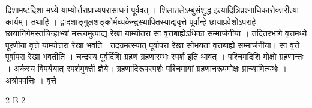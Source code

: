 \documentclass[11pt, openany]{book}
\begin{document}
\begin{sloppypar}
 दिशामष्टदिशां मध्ये याम्योर्त्तराप्राच्यपरासाधनं पूर्ववत् । शिलातलेऽम्बुसंशुद्ध इत्यादित्रिप्रश्नाधिकारोक्तरीत्या कार्यम्। तथाहि । द्वादशाङ्गुलशङ्कोर्मध्यकेन्द्रस्थापितस्याद्यवृत्ते पूर्वान्हे छायाप्रवेशोऽपराहे छायानिर्गमस्तचिन्हाभ्यां मस्त्यमुत्पाद्य रेखा याम्योतरा सा वृत्तबाह्येऽधिका सम्मार्जनीया । तदितरभागे वृत्तमध्ये पूरणीया वृत्ते याम्योत्तरा रेखा भवति। तदग्रमत्स्यात् पूर्वापरा रेखा सोभयता वृत्तबाह्ये सम्मार्जनीया। सा वृत्ते पूर्वापरा रेखा भवतीति । चन्द्रस्य पूर्वर्दिशि ग्रहणं ग्रहणारम्भः स्पर्श इति थावत् । पश्चिमदिशि मोक्षो ग्रहणान्तः । अर्कस्य विपर्ययात् स्पर्शमुक्ती ज्ञेये। ग्रहणादिरूपस्पर्शः पश्चिमायां ग्रहणानरूपमोक्षः प्राच्यामित्यर्थः । अत्रोपपत्तिः । वृत्ते
\end{sloppypar}

{ \tiny{2 B 2}}
\end{document}
